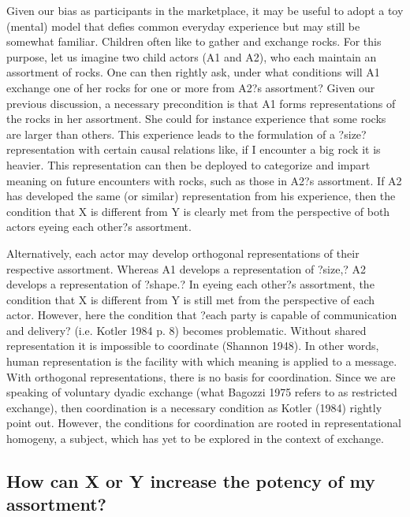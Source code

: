 Given our bias as participants in the marketplace, it may be useful to adopt a toy (mental) model that defies common everyday experience but may still be somewhat familiar. Children often like to gather and exchange rocks. For this purpose, let us imagine two child actors (A1 and A2), who each maintain an assortment of rocks. One can then rightly ask, under what conditions will A1 exchange one of her rocks for one or more from A2?s assortment? Given our previous discussion, a necessary precondition is that A1 forms representations of the rocks in her assortment. She could for instance experience that some rocks are larger than others. This experience leads to the formulation of a ?size? representation with certain causal relations like, if I encounter a big rock it is heavier. This representation can then be deployed to categorize and impart meaning on future encounters with rocks, such as those in A2?s assortment. If A2 has developed the same (or similar) representation from his experience, then the condition that X is different from Y is clearly met from the perspective of both actors eyeing each other?s assortment.

Alternatively, each actor may develop orthogonal representations of their respective assortment. Whereas A1 develops a representation of ?size,? A2 develops a representation of ?shape.? In eyeing each other?s assortment, the condition that X is different from Y is still met from the perspective of each actor. However, here the condition that ?each party is capable of communication and delivery? (i.e. Kotler 1984 p. 8) becomes problematic. Without shared representation it is impossible to coordinate (Shannon 1948). In other words, human representation is the facility with which meaning is applied to a message. With orthogonal representations, there is no basis for coordination. Since we are speaking of voluntary dyadic exchange (what Bagozzi 1975 refers to as restricted exchange), then coordination is a necessary condition as Kotler (1984) rightly point out. However, the conditions for coordination are rooted in representational homogeny, a subject, which has yet to be explored in the context of exchange.

\subsection{How can X or Y increase the potency of my assortment?}

